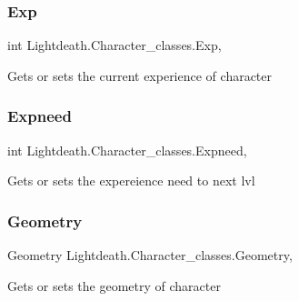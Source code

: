 \subsubsection{\texorpdfstring{Exp}{Exp}}
{\footnotesize\ttfamily int Lightdeath.\+Character\+\_\+classes.\+Exp\hspace{0.3cm}{\ttfamily [get]}, {\ttfamily [set]}}



Gets or sets the current experience of character 

\hypertarget{class_lightdeath_1_1_character__classes_acdb5c8b66a8a4f7a9f17cf4dc4839a80}{}\label{class_lightdeath_1_1_character__classes_acdb5c8b66a8a4f7a9f17cf4dc4839a80} 
\subsubsection{\texorpdfstring{Expneed}{Expneed}}
{\footnotesize\ttfamily int Lightdeath.\+Character\+\_\+classes.\+Expneed\hspace{0.3cm}{\ttfamily [get]}, {\ttfamily [set]}}



Gets or sets the expereience need to next lvl 

\hypertarget{class_lightdeath_1_1_character__classes_ae48c731b1e9d61ad489cbdf56020fecc}{}\label{class_lightdeath_1_1_character__classes_ae48c731b1e9d61ad489cbdf56020fecc} 
\subsubsection{\texorpdfstring{Geometry}{Geometry}}
{\footnotesize\ttfamily Geometry Lightdeath.\+Character\+\_\+classes.\+Geometry\hspace{0.3cm}{\ttfamily [get]}, {\ttfamily [set]}}



Gets or sets the geometry of character 

\hypertarget{class_lightdeath_1_1_character__classes_a9881180d8ff6f85d1ec3109b719fc48c}{}\label{class_lightdeath_1_1_character__classes_a9881180d8ff6f85d1ec3109b719fc48c} 
